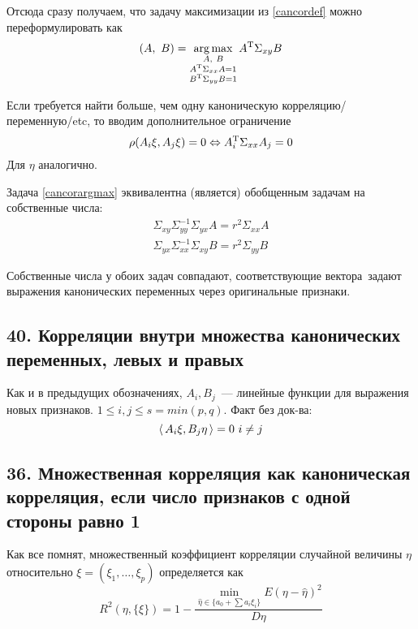 Отсюда сразу получаем, что задачу максимизации из \eqref{cancordef} можно переформулировать как
 \begin{equation}
\label{cancorargmax}
(A, B) = \argmax \limits_{\substack{A, B\\ \Tr{A}\Sigma_{xx}A=1\\ \Tr{B}\Sigma_{yy}B = 1}} \Tr{A} \Sigma_{xy} B
 \end{equation}

Если требуется найти больше, чем одну каноническую корреляцию/переменную/etc, то вводим дополнительное ограничение
\begin{equation}
\rho(A_i\xi, A_j\xi) = 0 \Leftrightarrow A_i^{\mathrm{T}}\Sigma_{xx}A_j = 0
\end{equation}
Для  $\eta$ аналогично.

Задача \eqref{cancorargmax} эквивалентна (является) обобщенным задачам на собственные числа:
\begin{align}
\Sigma_{xy}\Sigma_{yy}^{-1}\Sigma_{yx} A = r^2 \Sigma_{xx}A\\
\Sigma_{yx}\Sigma_{xx}^{-1}\Sigma_{xy} B = r^2 \Sigma_{yy}B
\end{align}

Собственные числа у обоих задач совпадают, соответствующие вектора задают выражения канонических переменных через оригинальные признаки. 

\subsection{40. Корреляции внутри множества канонических переменных, левых и правых}
Как и в предыдущих обозначениях, $A_i, B_j$ — линейные функции для выражения новых признаков. $1 \leq i, j \leq s = min(p, q)$. 
Факт без док-ва: 
$$ \Inner{A_i\xi}{B_j\eta} = 0 i \neq j$$


\subsection{36. Множественная корреляция как каноническая корреляция, если число признаков с одной стороны равно 1}

Как все помнят, множественный коэффициент корреляции случайной величины $\eta$ относительно $\xi=(\xi_1, …, \xi_p)$ определяется как 
\begin{equation}
R^2(\eta, \{\xi\}) = 1 - \frac{\min\limits_{\hat{\eta} \in\{a_0 + \sum a_i \xi_i\}} E\left(\eta-\hat{\eta}\right)^2}{D\eta}
\end{equation}

